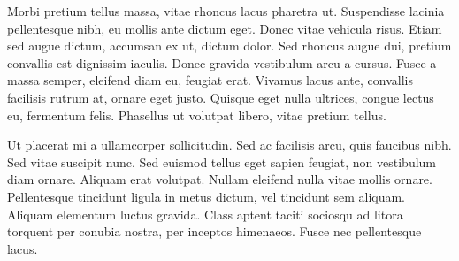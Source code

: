 Morbi pretium tellus massa, vitae rhoncus lacus pharetra ut. Suspendisse lacinia pellentesque nibh, eu mollis ante dictum eget. Donec vitae vehicula risus. Etiam sed augue dictum, accumsan ex ut, dictum dolor. Sed rhoncus augue dui, pretium convallis est dignissim iaculis. Donec gravida vestibulum arcu a cursus. Fusce a massa semper, eleifend diam eu, feugiat erat. Vivamus lacus ante, convallis facilisis rutrum at, ornare eget justo. Quisque eget nulla ultrices, congue lectus eu, fermentum felis. Phasellus ut volutpat libero, vitae pretium tellus.

Ut placerat mi a ullamcorper sollicitudin. Sed ac facilisis arcu, quis faucibus nibh. Sed vitae suscipit nunc. Sed euismod tellus eget sapien feugiat, non vestibulum diam ornare. Aliquam erat volutpat. Nullam eleifend nulla vitae mollis ornare. Pellentesque tincidunt ligula in metus dictum, vel tincidunt sem aliquam. Aliquam elementum luctus gravida. Class aptent taciti sociosqu ad litora torquent per conubia nostra, per inceptos himenaeos. Fusce nec pellentesque lacus.